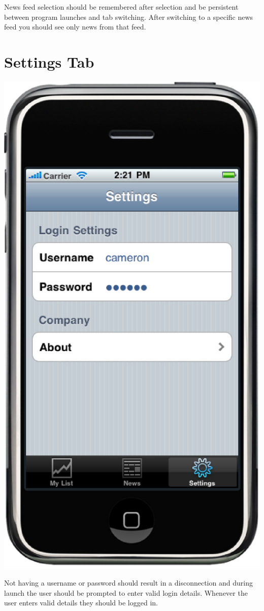 \documentclass[12pt,twoside,letterpaper]{report}
\begin{document}
News feed selection should be remembered after selection and be persistent between program launches and tab switching. After switching to a specific news feed you should see only news from that feed.

\section*{Settings Tab}
\includegraphics[scale=0.5]{settings}

Not having a username or password should result in a disconnection and during launch the user should be prompted to enter valid login details. Whenever the user enters valid details they should be logged in.
\end{document}
